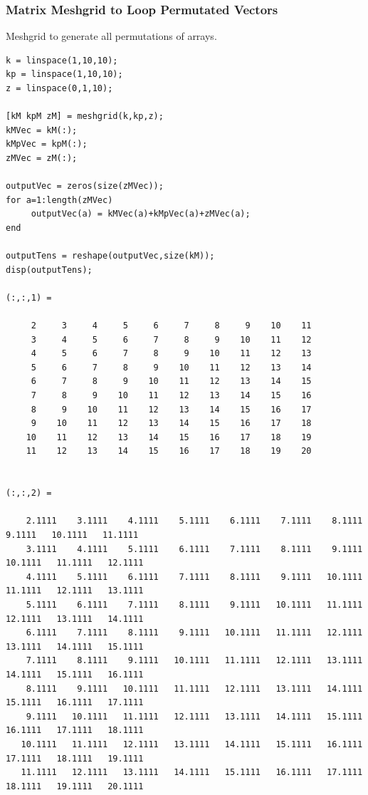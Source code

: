 \documentclass[
]{book}
\begin{document}
\hypertarget{matrix-meshgrid-to-loop-permutated-vectors}{%
\subsubsection{Matrix Meshgrid to Loop Permutated Vectors}\label{matrix-meshgrid-to-loop-permutated-vectors}}

Meshgrid to generate all permutations of arrays.

\begin{verbatim}
k = linspace(1,10,10);
kp = linspace(1,10,10);
z = linspace(0,1,10);
 
[kM kpM zM] = meshgrid(k,kp,z);
kMVec = kM(:);
kMpVec = kpM(:);
zMVec = zM(:);
 
outputVec = zeros(size(zMVec));
for a=1:length(zMVec)
     outputVec(a) = kMVec(a)+kMpVec(a)+zMVec(a);
end
 
outputTens = reshape(outputVec,size(kM));
disp(outputTens);

(:,:,1) =

     2     3     4     5     6     7     8     9    10    11
     3     4     5     6     7     8     9    10    11    12
     4     5     6     7     8     9    10    11    12    13
     5     6     7     8     9    10    11    12    13    14
     6     7     8     9    10    11    12    13    14    15
     7     8     9    10    11    12    13    14    15    16
     8     9    10    11    12    13    14    15    16    17
     9    10    11    12    13    14    15    16    17    18
    10    11    12    13    14    15    16    17    18    19
    11    12    13    14    15    16    17    18    19    20


(:,:,2) =

    2.1111    3.1111    4.1111    5.1111    6.1111    7.1111    8.1111    9.1111   10.1111   11.1111
    3.1111    4.1111    5.1111    6.1111    7.1111    8.1111    9.1111   10.1111   11.1111   12.1111
    4.1111    5.1111    6.1111    7.1111    8.1111    9.1111   10.1111   11.1111   12.1111   13.1111
    5.1111    6.1111    7.1111    8.1111    9.1111   10.1111   11.1111   12.1111   13.1111   14.1111
    6.1111    7.1111    8.1111    9.1111   10.1111   11.1111   12.1111   13.1111   14.1111   15.1111
    7.1111    8.1111    9.1111   10.1111   11.1111   12.1111   13.1111   14.1111   15.1111   16.1111
    8.1111    9.1111   10.1111   11.1111   12.1111   13.1111   14.1111   15.1111   16.1111   17.1111
    9.1111   10.1111   11.1111   12.1111   13.1111   14.1111   15.1111   16.1111   17.1111   18.1111
   10.1111   11.1111   12.1111   13.1111   14.1111   15.1111   16.1111   17.1111   18.1111   19.1111
   11.1111   12.1111   13.1111   14.1111   15.1111   16.1111   17.1111   18.1111   19.1111   20.1111



\end{verbatim}
\end{document}
